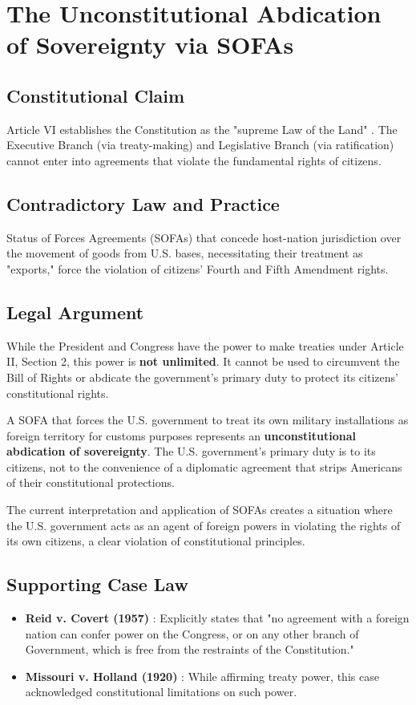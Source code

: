 ﻿\section{The Unconstitutional Abdication of Sovereignty via SOFAs}

\subsection{Constitutional Claim}
Article VI establishes the Constitution as the "supreme Law of the Land" \cite{usconstitution}. The Executive Branch (via treaty-making) and Legislative Branch (via ratification) cannot enter into agreements that violate the fundamental rights of citizens.

\subsection{Contradictory Law and Practice}
Status of Forces Agreements (SOFAs) that concede host-nation jurisdiction over the movement of goods from U.S. bases, necessitating their treatment as "exports," force the violation of citizens' Fourth and Fifth Amendment rights.

\subsection{Legal Argument}
While the President and Congress have the power to make treaties under Article II, Section 2, this power is \textbf{not unlimited}. It cannot be used to circumvent the Bill of Rights or abdicate the government's primary duty to protect its citizens' constitutional rights.

A SOFA that forces the U.S. government to treat its own military installations as foreign territory for customs purposes represents an \textbf{unconstitutional abdication of sovereignty}. The U.S. government's primary duty is to its citizens, not to the convenience of a diplomatic agreement that strips Americans of their constitutional protections.

The current interpretation and application of SOFAs creates a situation where the U.S. government acts as an agent of foreign powers in violating the rights of its own citizens, a clear violation of constitutional principles.

\subsection{Supporting Case Law}
\begin{itemize}
    \item \textbf{Reid v. Covert (1957)} \cite{reid1957}: Explicitly states that "no agreement with a foreign nation can confer power on the Congress, or on any other branch of Government, which is free from the restraints of the Constitution."
    \item \textbf{Missouri v. Holland (1920)} \cite{missouri1920}: While affirming treaty power, this case acknowledged constitutional limitations on such power.
\end{itemize}
